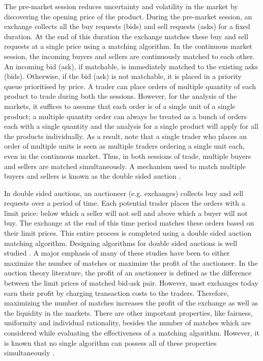 \documentclass[a4paper,UKenglish,cleveref, autoref]{lipics-v2019}
\begin{document}
The pre-market session reduces uncertainty and volatility in the market by discovering the opening price of the product. During the pre-market session, an exchange collects all the buy requests (bids) and sell requests (asks) for a fixed duration. At the end of this duration the exchange matches these buy and sell requests at a single price using a matching algorithm. In the continuous market session, the incoming buyers and sellers are continuously matched to each other. An incoming bid (ask), if matchable, is immediately matched to the existing asks (bids). Otherwise, if the bid (ask) is not matchable, it is placed in a priority queue prioritised by price. A trader can place orders of multiple quantity of each product to trade during both the sessions. However, for the analysis of the markets, it suffices to assume that each order is of a single unit of a single product; a multiple quantity order can always be treated as a bunch of orders each with a single quantity and the analysis for a single product will apply for all the products individually. As a result, note that a single trader who places an order of multiple units is seen as multiple traders ordering a single unit each, even in the continuous market. Thus, in both sessions of trade, multiple buyers and sellers are matched simultaneously. A mechanism used to match multiple buyers and sellers is known as the double sided auction \cite{friedman}.

In double sided auctions, an auctioneer (e.g. exchanges) collects buy and sell requests over a period of time. Each potential trader places the orders with a limit price: below which a seller will not sell and above which a buyer will not buy. The exchange at the end of this time period matches these orders based on their limit prices. This entire process is completed using a double sided auction matching algorithm. Designing algorithms for double sided auctions is well studied \cite{mcafee1992, WurmanWW98,NiuP13}. A major emphasis of many of these studies have been to either maximize the number of matches or  maximize the profit of the auctioneer. In the auction theory literature, the profit of an auctioneer is defined as the difference between the limit prices of matched bid-ask pair. However, most exchanges today earn their profit by charging transaction costs to the traders. Therefore, maximizing the number of matches increases the profit of the exchange as well as the liquidity in the markets.  There are other important properties, like fairness, uniformity and individual rationality, besides the number of matches which are considered while evaluating the effectiveness of a matching algorithm. However, it is known that no single algorithm can possess all of these properties simultaneously \cite{WurmanWW98,mcafee1992}. 
\end{document}
